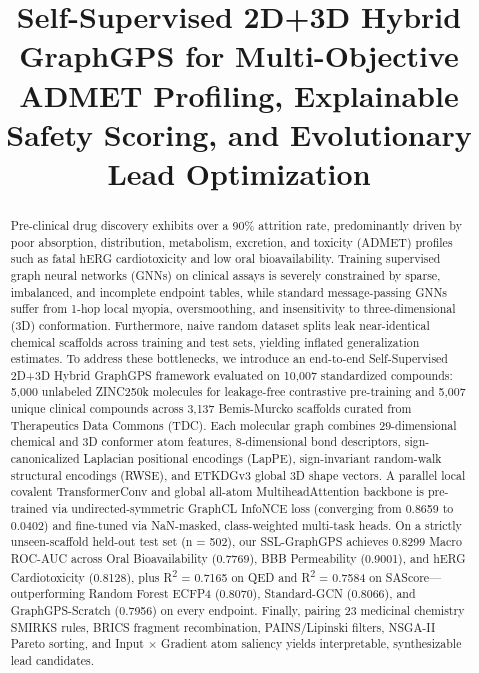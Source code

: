\documentclass[conference]{IEEEtran}
\begin{document}
\title{Self-Supervised 2D+3D Hybrid GraphGPS for Multi-Objective ADMET Profiling, Explainable Safety Scoring, and Evolutionary Lead Optimization}

\author{
}

\maketitle

\begin{abstract}
Pre-clinical drug discovery exhibits over a 90\% attrition rate, predominantly driven by poor absorption, distribution, metabolism, excretion, and toxicity (ADMET) profiles such as fatal hERG cardiotoxicity and low oral bioavailability. Training supervised graph neural networks (GNNs) on clinical assays is severely constrained by sparse, imbalanced, and incomplete endpoint tables, while standard message-passing GNNs suffer from 1-hop local myopia, oversmoothing, and insensitivity to three-dimensional (3D) conformation. Furthermore, naive random dataset splits leak near-identical chemical scaffolds across training and test sets, yielding inflated generalization estimates. To address these bottlenecks, we introduce an end-to-end Self-Supervised 2D+3D Hybrid GraphGPS framework evaluated on 10,007 standardized compounds: 5,000 unlabeled ZINC250k molecules for leakage-free contrastive pre-training and 5,007 unique clinical compounds across 3,137 Bemis-Murcko scaffolds curated from Therapeutics Data Commons (TDC). Each molecular graph combines 29-dimensional chemical and 3D conformer atom features, 8-dimensional bond descriptors, sign-canonicalized Laplacian positional encodings (LapPE), sign-invariant random-walk structural encodings (RWSE), and ETKDGv3 global 3D shape vectors. A parallel local covalent TransformerConv and global all-atom MultiheadAttention backbone is pre-trained via undirected-symmetric GraphCL InfoNCE loss (converging from 0.8659 to 0.0402) and fine-tuned via NaN-masked, class-weighted multi-task heads. On a strictly unseen-scaffold held-out test set (n = 502), our SSL-GraphGPS achieves 0.8299 Macro ROC-AUC across Oral Bioavailability (0.7769), BBB Permeability (0.9001), and hERG Cardiotoxicity (0.8128), plus R\textsuperscript{2} = 0.7165 on QED and R\textsuperscript{2} = 0.7584 on SAScore---outperforming Random Forest ECFP4 (0.8070), Standard-GCN (0.8066), and GraphGPS-Scratch (0.7956) on every endpoint. Finally, pairing 23 medicinal chemistry SMIRKS rules, BRICS fragment recombination, PAINS/Lipinski filters, NSGA-II Pareto sorting, and Input $\times$ Gradient atom saliency yields interpretable, synthesizable lead candidates.
\end{abstract}
\end{document}
